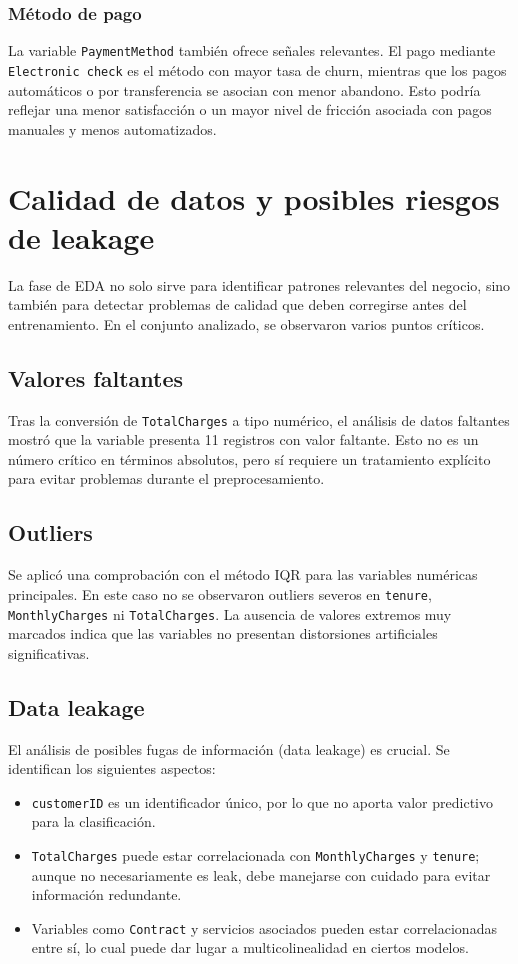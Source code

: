 \documentclass[conference]{IEEEtran}
\begin{document}
\subsubsection{Método de pago}
La variable \texttt{PaymentMethod} también ofrece señales relevantes. El pago mediante \texttt{Electronic check} es el método con mayor tasa de churn, mientras que los pagos automáticos o por transferencia se asocian con menor abandono. Esto podría reflejar una menor satisfacción o un mayor nivel de fricción asociada con pagos manuales y menos automatizados.

\section{Calidad de datos y posibles riesgos de leakage}
La fase de EDA no solo sirve para identificar patrones relevantes del negocio, sino también para detectar problemas de calidad que deben corregirse antes del entrenamiento. En el conjunto analizado, se observaron varios puntos críticos.

\subsection{Valores faltantes}
Tras la conversión de \texttt{TotalCharges} a tipo numérico, el análisis de datos faltantes mostró que la variable presenta 11 registros con valor faltante. Esto no es un número crítico en términos absolutos, pero sí requiere un tratamiento explícito para evitar problemas durante el preprocesamiento.

\subsection{Outliers}
Se aplicó una comprobación con el método IQR para las variables numéricas principales. En este caso no se observaron outliers severos en \texttt{tenure}, \texttt{MonthlyCharges} ni \texttt{TotalCharges}. La ausencia de valores extremos muy marcados indica que las variables no presentan distorsiones artificiales significativas.

\subsection{Data leakage}
El análisis de posibles fugas de información (data leakage) es crucial. Se identifican los siguientes aspectos:
\begin{itemize}[leftmargin=*]
 \item \texttt{customerID} es un identificador único, por lo que no aporta valor predictivo para la clasificación.
 \item \texttt{TotalCharges} puede estar correlacionada con \texttt{MonthlyCharges} y \texttt{tenure}; aunque no necesariamente es leak, debe manejarse con cuidado para evitar información redundante.
 \item Variables como \texttt{Contract} y servicios asociados pueden estar correlacionadas entre sí, lo cual puede dar lugar a multicolinealidad en ciertos modelos.
\end{itemize}
\end{document}

